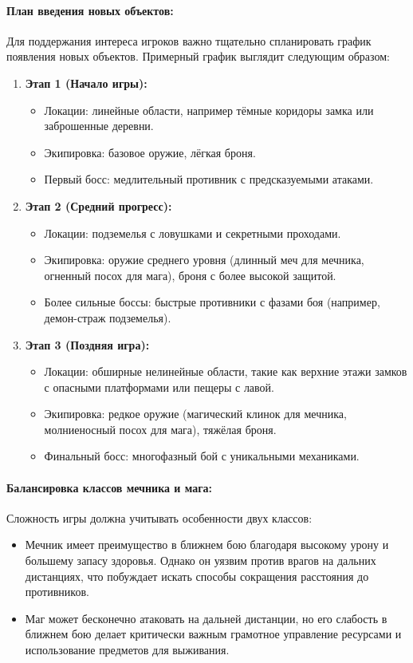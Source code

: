 \documentclass{article}
\begin{document}
\paragraph{План введения новых объектов:}
Для поддержания интереса игроков важно тщательно спланировать график появления новых объектов. Примерный график выглядит следующим образом:
\begin{enumerate}
    \item \textbf{Этап 1 (Начало игры):}
    \begin{itemize}
        \item Локации: линейные области, например тёмные коридоры замка или заброшенные деревни.
        \item Экипировка: базовое оружие, лёгкая броня.
        \item Первый босс: медлительный противник с предсказуемыми атаками.
    \end{itemize}
    \item \textbf{Этап 2 (Средний прогресс):}
    \begin{itemize}
        \item Локации: подземелья с ловушками и секретными проходами.
        \item Экипировка: оружие среднего уровня (длинный меч для мечника, огненный посох для мага), броня с более высокой защитой.
        \item Более сильные боссы: быстрые противники с фазами боя (например, демон-страж подземелья).
    \end{itemize}
    \item \textbf{Этап 3 (Поздняя игра):}
    \begin{itemize}
        \item Локации: обширные нелинейные области, такие как верхние этажи замков с опасными платформами или пещеры с лавой.
        \item Экипировка: редкое оружие (магический клинок для мечника, молниеносный посох для мага), тяжёлая броня.
        \item Финальный босс: многофазный бой с уникальными механиками.
    \end{itemize}
\end{enumerate}

\paragraph{Балансировка классов мечника и мага:}
Сложность игры должна учитывать особенности двух классов:
\begin{itemize}
    \item Мечник имеет преимущество в ближнем бою благодаря высокому урону и большему запасу здоровья. Однако он уязвим против врагов на дальних дистанциях, что побуждает искать способы сокращения расстояния до противников.
    \item Маг может бесконечно атаковать на дальней дистанции, но его слабость в ближнем бою делает критически важным грамотное управление ресурсами и использование предметов для выживания.
\end{itemize}
\end{document}

